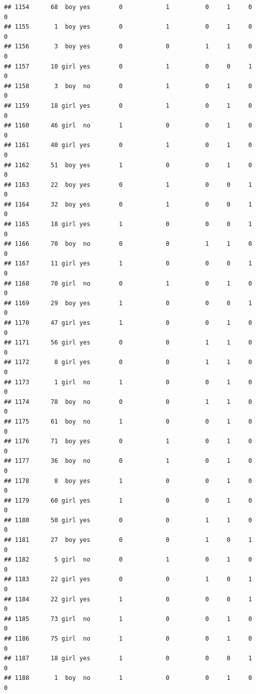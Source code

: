 \documentclass[man]{apa6}
\begin{document}
\begin{verbatim}
## 1154      68  boy yes        0            1          0     1     0     0
## 1155       1  boy yes        0            1          0     1     0     0
## 1156       3  boy yes        0            0          1     1     0     0
## 1157      10 girl yes        0            1          0     0     1     0
## 1158       3  boy  no        0            1          0     1     0     0
## 1159      18 girl yes        0            1          0     1     0     0
## 1160      46 girl  no        1            0          0     1     0     0
## 1161      40 girl yes        0            1          0     1     0     0
## 1162      51  boy yes        1            0          0     1     0     0
## 1163      22  boy yes        0            1          0     0     1     0
## 1164      32  boy yes        0            1          0     0     1     0
## 1165      18 girl yes        1            0          0     0     1     0
## 1166      70  boy  no        0            0          1     1     0     0
## 1167      11 girl yes        1            0          0     0     1     0
## 1168      70 girl  no        0            1          0     1     0     0
## 1169      29  boy yes        1            0          0     0     1     0
## 1170      47 girl yes        1            0          0     1     0     0
## 1171      56 girl yes        0            0          1     1     0     0
## 1172       8 girl yes        0            0          1     1     0     0
## 1173       1 girl  no        1            0          0     1     0     0
## 1174      78  boy  no        0            0          1     1     0     0
## 1175      61  boy  no        1            0          0     1     0     0
## 1176      71  boy yes        0            1          0     1     0     0
## 1177      36  boy  no        0            1          0     1     0     0
## 1178       8  boy yes        1            0          0     1     0     0
## 1179      60 girl yes        1            0          0     1     0     0
## 1180      50 girl yes        0            0          1     1     0     0
## 1181      27  boy yes        0            0          1     0     1     0
## 1182       5 girl  no        0            1          0     1     0     0
## 1183      22 girl yes        0            0          1     0     1     0
## 1184      22 girl yes        1            0          0     0     1     0
## 1185      73 girl  no        1            0          0     1     0     0
## 1186      75 girl  no        1            0          0     1     0     0
## 1187      18 girl yes        1            0          0     0     1     0
## 1188       1  boy  no        1            0          0     1     0     0

\end{verbatim}
\end{document}
